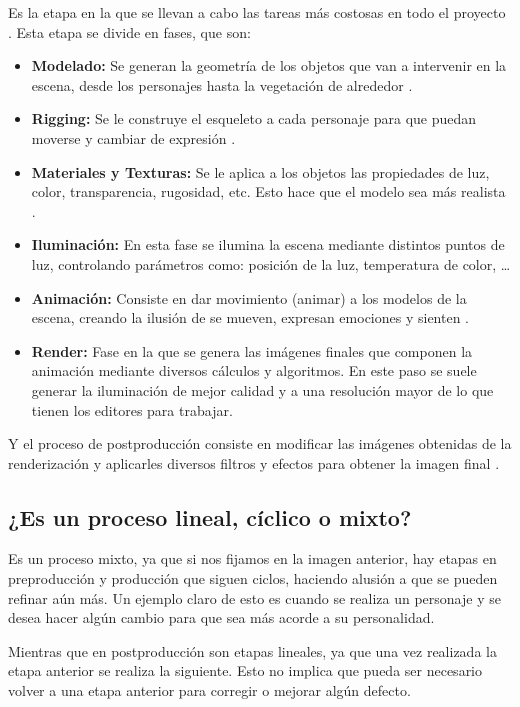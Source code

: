 \documentclass{article}
\begin{document}
\bigskip

Es la etapa en la que se llevan a cabo las tareas más costosas en todo el proyecto \cite{uclm}. Esta etapa se divide en fases, que son:

\begin{itemize}
    \item \textbf{Modelado: }Se generan la geometría de los objetos que van a intervenir en la escena, desde los personajes hasta la vegetación de alrededor \cite{uclm}.
    \item \textbf{Rigging: }Se le construye el esqueleto a cada personaje para que puedan moverse y cambiar de expresión \cite{animum}.
    \item \textbf{Materiales y Texturas: }Se le aplica a los objetos las propiedades de luz, color, transparencia, rugosidad, etc. Esto hace que el modelo sea más realista \cite{animum}.
    \item \textbf{Iluminación: }En esta fase se ilumina la escena mediante distintos puntos de luz, controlando parámetros como: posición de la luz, temperatura de color, \dots \cite{animum}
    \item \textbf{Animación: }Consiste en dar movimiento (animar) a los modelos de la escena, creando la ilusión de se mueven, expresan emociones y sienten \cite{animum}.
    \item \textbf{Render: }Fase en la que se genera las imágenes finales que componen la animación mediante diversos cálculos y algoritmos. En este paso se suele generar la iluminación de mejor calidad y a una resolución mayor de lo que tienen los editores para trabajar.
\end{itemize}

Y el proceso de postproducción consiste en modificar las imágenes obtenidas de la renderización y aplicarles diversos filtros y efectos para obtener la imagen final \cite{uclm}.

\subsection{¿Es un proceso lineal, cíclico o mixto?}
Es un proceso mixto, ya que si nos fijamos en la imagen anterior, hay etapas en preproducción y producción que siguen ciclos, haciendo alusión a que se pueden refinar aún más. Un ejemplo claro de esto es cuando se realiza un personaje y se desea hacer algún cambio para que sea más acorde a su personalidad.

\bigskip

Mientras que en postproducción son etapas lineales, ya que una vez realizada la etapa anterior se realiza la siguiente. Esto no implica que pueda ser necesario volver a una etapa anterior para corregir o mejorar algún defecto.
\end{document}
